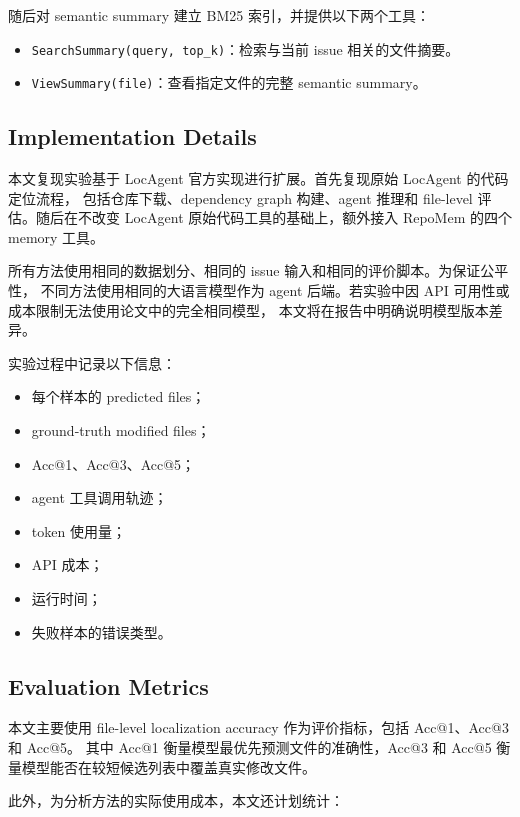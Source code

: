 \documentclass[11pt]{article}
\begin{document}
随后对 semantic summary 建立 BM25 索引，并提供以下两个工具：

\begin{itemize}
    \item \texttt{SearchSummary(query, top\_k)}：检索与当前 issue 相关的文件摘要。
    \item \texttt{ViewSummary(file)}：查看指定文件的完整 semantic summary。
\end{itemize}

\subsection{Implementation Details}
\label{subsec:implementation_details}

本文复现实验基于 LocAgent 官方实现进行扩展。首先复现原始 LocAgent 的代码定位流程，
包括仓库下载、dependency graph 构建、agent 推理和 file-level 评估。随后在不改变 LocAgent
原始代码工具的基础上，额外接入 RepoMem 的四个 memory 工具。

所有方法使用相同的数据划分、相同的 issue 输入和相同的评价脚本。为保证公平性，
不同方法使用相同的大语言模型作为 agent 后端。若实验中因 API 可用性或成本限制无法使用论文中的完全相同模型，
本文将在报告中明确说明模型版本差异。

实验过程中记录以下信息：

\begin{itemize}
    \item 每个样本的 predicted files；
    \item ground-truth modified files；
    \item Acc@1、Acc@3、Acc@5；
    \item agent 工具调用轨迹；
    \item token 使用量；
    \item API 成本；
    \item 运行时间；
    \item 失败样本的错误类型。
\end{itemize}

\subsection{Evaluation Metrics}
\label{subsec:evaluation_metrics}

本文主要使用 file-level localization accuracy 作为评价指标，包括 Acc@1、Acc@3 和 Acc@5。
其中 Acc@1 衡量模型最优先预测文件的准确性，Acc@3 和 Acc@5 衡量模型能否在较短候选列表中覆盖真实修改文件。

此外，为分析方法的实际使用成本，本文还计划统计：
\end{document}
